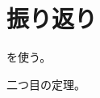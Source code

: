 \documentclass[../main.tex]{subfiles}
\begin{document}
\chapter{振り返り}
 を使う。
\begin{localresult}
二つ目の定理。
\end{localresult}
\end{document}
